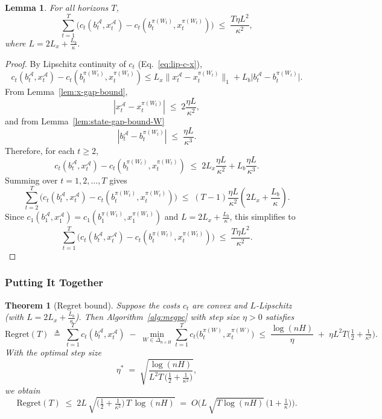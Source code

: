 \documentclass[11pt]{article}
\newtheorem{Thm:Theorem}{Theorem}
\newtheorem{Thm:Lemma}{Lemma}
\begin{document}
\begin{Thm:Lemma}
\label{lem:stab-sum-W}
For all horizons \(T\),
\[
\sum_{t=1}^T \Big(
c_t\!\left(b_t^\mathcal{A},x_t^\mathcal{A}\right)
-
c_t\!\left(b_t^{\pi(W_t)},x_t^{\pi(W_t)}\right)
\Big)
\;\le\;
\frac{T \eta L^2}{\kappa^2},
\]
where \(L = 2 L_x + \tfrac{L_b}{\kappa}\).
\end{Thm:Lemma}
\begin{proof}
By Lipschitz continuity of \(c_t\) (Eq.~\eqref{eq:lip-c-x}),
\[
c_t\!\left(b_t^\mathcal{A},x_t^\mathcal{A}\right)
-
c_t\!\left(b_t^{\pi(W_t)},x_t^{\pi(W_t)}\right) 
\le
L_x \big\|x_t^\mathcal{A} - x_t^{\pi(W_t)}\big\|_1
+ L_b \big|b_t^\mathcal{A} - b_t^{\pi(W_t)}\big|.
\]
From Lemma~\ref{lem:x-gap-bound},
\[
|x_t^\mathcal{A} - x_t^{\pi(W_t)}|
\;\le\; 2\frac{\eta L}{\kappa^2},
\]
and from Lemma~\ref{lem:state-gap-bound-W}
\[
|b_t^\mathcal{A} - b_t^{\pi(W_t)}|
\;\le\; \frac{\eta L}{\kappa^3}.
\]
Therefore, for each \(t \ge 2\),
\[
c_t\!\left(b_t^\mathcal{A},x_t^\mathcal{A}\right)
-
c_t\!\left(b_t^{\pi(W_t)},x_t^{\pi(W_t)}\right)
\;\le\;
2L_x \frac{\eta L}{\kappa^2}
+ L_b \frac{\eta L}{\kappa^3}.
\]
Summing over \(t=1,2,\dots,T\) gives
\[
\sum_{t=2}^T
\Big(
c_t(b_t^\mathcal{A},x_t^\mathcal{A})
-
c_t(b_t^{\pi(W_t)},x_t^{\pi(W_t)})
\Big)
\;\le\;
(T-1)\frac{\eta L}{\kappa^2}\left(
2 L_x 
+  \frac{L_b}{\kappa}
\right).
\]
Since 
\(c_1(b_1^\mathcal{A},x_1^\mathcal{A})
=
c_1(b_1^{\pi(W_1)},x_1^{\pi(W_1)})\) and \(L = 2 L_x + \tfrac{L_b}{\kappa}\), this simplifies to
\[
\sum_{t=1}^T
\Big(
c_t(b_t^\mathcal{A},x_t^\mathcal{A})
-
c_t(b_t^{\pi(W_t)},x_t^{\pi(W_t)})
\Big)
\;\le\;
\frac{T \eta L^2}{\kappa^2}.
\]
\end{proof}


\subsubsection{Putting It Together}

\begin{Thm:Theorem}[Regret bound]
\label{thm:regret-W}
Suppose the costs \(c_t\) are convex and \(L\)-Lipschitz (with \(L = 2 L_x + \tfrac{L_b}{\kappa}\)).  
Then Algorithm~\ref{alg:megpc} with step size \(\eta>0\) satisfies
\[
\mathrm{Regret}(T)
\;\triangleq\;
\sum_{t=1}^T c_t(b_t^\mathcal{A},x_t^\mathcal{A})
\;-\;
\min_{W\in\Delta_{n\times H}}\sum_{t=1}^T c_t\!\big(b_t^{\pi(W)},x_t^{\pi(W)}\big)
\;\le\;
\frac{\log (nH)}{\eta} \;+\; \eta L^2 T\Big(\tfrac{1}{2} + \tfrac{1}{\kappa^2}\Big).
\]
With the optimal step size
\[
\eta^* \;=\; \sqrt{\frac{\log (nH)}{L^2 T \,\big(\tfrac{1}{2}+\tfrac{1}{\kappa^2}\big)}},
\]
we obtain
\[
\mathrm{Regret}(T)
\;\le\;
2L\,\sqrt{\Big(\tfrac{1}{2}+\tfrac{1}{\kappa^2}\Big)\,T\,\log (nH)}
\;=\; O\!\Big(L\,\sqrt{T\log (nH)}\,\big(1+\tfrac{1}{\kappa}\big)\Big).
\]
\end{Thm:Theorem}
\end{document}
